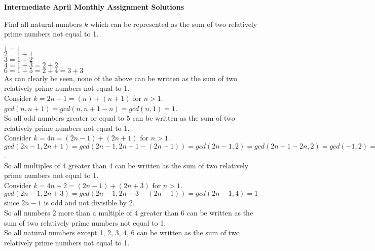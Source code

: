 \documentclass{article}
\begin{document}
\thispagestyle{empty}

\begin{center}
  \textbf{\Large Intermediate April Monthly Assignment Solutions}
\end{center}

\vspace{12pt}

\begin{enumerate}[1.]
\vspace{24pt}
{\itshape \item %
Find all natural numbers $k$ which can be represented as the sum of two relatively prime numbers not equal to 1.}

$1 = 1$\\
$2 = 1+1$\\
$3 = 1+2$\\
$4 = 1+3 = 2+2$\\
$6 = 1+5 = 2+4 = 3+3$\\
As can clearly be seen, none of the above can be written as the sum of two relatively prime numbers not equal to 1.\\
\newline
Consider $k = 2n+1 = (n) + (n+1)$ for $n > 1$.\\
$gcd(n, n+1) = gcd(n, n+1 - n) = gcd(n, 1) = 1$.\\
So all odd numbers greater or equal to 5 can be written as the sum of two relatively prime numbers not equal to 1.\\
\newline
Consider $k = 4n = (2n-1) + (2n+1)$ for $n > 1$.\\
$gcd(2n-1, 2n+1) = gcd(2n-1, 2n+1 - (2n-1)) = gcd(2n-1, 2) = gcd(2n-1 - 2n, 2) = gcd(-1, 2) = gcd(1, 2) = 1$.\\
So all multiples of 4 greater than 4 can be written as the sum of two relatively prime numbers not equal to 1.\\
\newline
Consider $k = 4n+2 = (2n-1) + (2n+3)$ for $n > 1$.\\
$gcd(2n-1, 2n+3) = gcd(2n-1, 2n+3 - (2n-1)) = gcd(2n-1, 4) = 1$ since $2n-1$ is odd and not divisible by 2.\\
So all numbers 2 more than a multiple of 4 greater than 6 can be written as the sum of two relatively prime numbers not equal to 1.\\
\newline
So all natural numbers except 1, 2, 3, 4, 6 can be written as the sum of two relatively prime numbers not equal to 1.


\end{enumerate}
\end{document}
